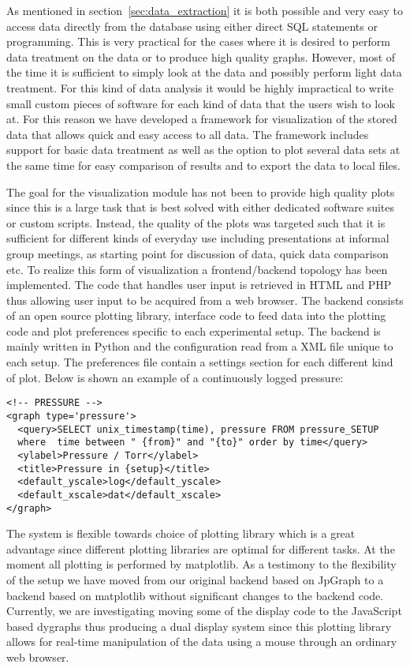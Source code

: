 As mentioned in section~\ref{sec:data_extraction} it is both possible and very
easy to access data directly from the database using either direct SQL
statements or programming. This is very practical for the cases where it is
desired to perform data treatment on the data or to produce high quality
graphs. However, most of the time it is sufficient to simply look at the data
and possibly perform light data treatment. For this kind of data analysis it
would be highly impractical to write small custom pieces of software for each
kind of data that the users wish to look at. For this reason we have developed
a framework for visualization of the stored data that allows quick and easy
access to all data. The framework includes support for basic data treatment as
well as the option to plot several data sets at the same time for easy
comparison of results and to export the data to local files.

The goal for the visualization module has not been to provide high quality
plots since this is a large task that is best solved with either dedicated
software suites or custom scripts. Instead, the quality of the plots was
targeted such that it is sufficient for different kinds of everyday use
including presentations at informal group meetings, as starting point for
discussion of data, quick data comparison etc. To realize this form of
visualization a frontend/backend topology has been implemented. The code that
handles user input is retrieved in HTML and PHP thus allowing user input to be
acquired from a web browser. The backend consists of an open source plotting
library, interface code to feed data into the plotting code and plot
preferences specific to each experimental setup. The backend is mainly written
in Python and the configuration read from a XML file unique to each setup. The
preferences file contain a settings section for each different kind of plot.
Below is shown an example of a continuously logged pressure:

\begin{verbatim} 
<!-- PRESSURE --> 
<graph type='pressure'>
  <query>SELECT unix_timestamp(time), pressure FROM pressure_SETUP
  where  time between " {from}" and "{to}" order by time</query>
  <ylabel>Pressure / Torr</ylabel>
  <title>Pressure in {setup}</title>
  <default_yscale>log</default_yscale>
  <default_xscale>dat</default_xscale>
</graph>
\end{verbatim}

The system is flexible towards choice of plotting library which is a great
advantage since different plotting libraries are optimal for different tasks.
At the moment all plotting is performed by matplotlib\cite{matplotlib}.  As a
testimony to the flexibility of the setup we have moved from our original
backend based on JpGraph\cite{jpgraph} to a backend based on matplotlib without
significant changes to the backend code. Currently, we are investigating moving
some of the display code to the JavaScript based dygraphs\cite{dygraphs} thus
producing a dual display system since this plotting library allows for real-time 
manipulation of the data using a mouse through an ordinary web browser.
